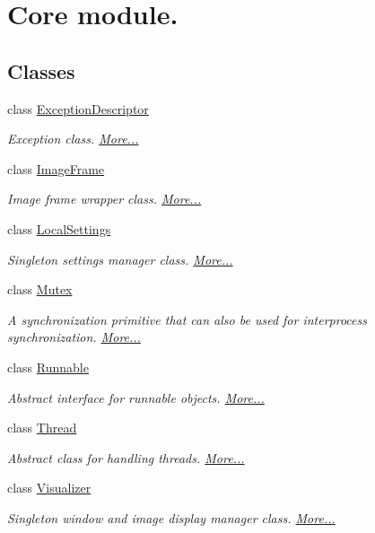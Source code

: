\hypertarget{group___core}{\section{Core module.}
\label{group___core}
}
\subsection*{Classes}
\begin{DoxyCompactItemize}
\item 
class \hyperlink{group___core_class_exception_descriptor}{Exception\-Descriptor}
\begin{DoxyCompactList}\small\item\em Exception class.  \hyperlink{group___core_class_exception_descriptor}{More...}\end{DoxyCompactList}\item 
class \hyperlink{group___core_class_image_frame}{Image\-Frame}
\begin{DoxyCompactList}\small\item\em Image frame wrapper class.  \hyperlink{group___core_class_image_frame}{More...}\end{DoxyCompactList}\item 
class \hyperlink{group___core_class_local_settings}{Local\-Settings}
\begin{DoxyCompactList}\small\item\em Singleton settings manager class.  \hyperlink{group___core_class_local_settings}{More...}\end{DoxyCompactList}\item 
class \hyperlink{group___core_class_mutex}{Mutex}
\begin{DoxyCompactList}\small\item\em A synchronization primitive that can also be used for interprocess synchronization.  \hyperlink{group___core_class_mutex}{More...}\end{DoxyCompactList}\item 
class \hyperlink{group___core_class_runnable}{Runnable}
\begin{DoxyCompactList}\small\item\em Abstract interface for runnable objects.  \hyperlink{group___core_class_runnable}{More...}\end{DoxyCompactList}\item 
class \hyperlink{group___core_class_thread}{Thread}
\begin{DoxyCompactList}\small\item\em Abstract class for handling threads.  \hyperlink{group___core_class_thread}{More...}\end{DoxyCompactList}\item 
class \hyperlink{group___core_class_visualizer}{Visualizer}
\begin{DoxyCompactList}\small\item\em Singleton window and image display manager class.  \hyperlink{group___core_class_visualizer}{More...}\end{DoxyCompactList}\end{DoxyCompactItemize}


